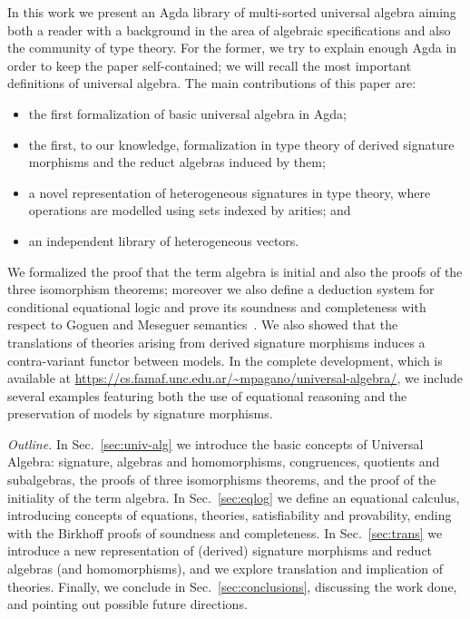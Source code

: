 In this work we present an Agda library of multi-sorted universal
algebra aiming both a reader with a background in the area of
algebraic specifications and also the community of type theory.  For
the former, we try to explain enough Agda in order to keep the paper
self-contained; we will recall the most important definitions of
universal algebra. The main contributions of this paper are:
\begin{itemize}
\item the first formalization of basic universal algebra in Agda;
\item the first, to our knowledge, formalization in type theory of
  derived signature morphisms and the reduct algebras induced by them;
\item a novel representation of heterogeneous signatures in
  type theory, where operations are modelled using sets indexed by
  arities; and
\item an independent library of heterogeneous vectors.
\end{itemize}
We formalized the proof that the term algebra is initial and also the
proofs of the three isomorphism theorems; moreover we also define a
deduction system for conditional equational logic and prove its
soundness and completeness with respect to Goguen and Meseguer semantics~\cite{GoguenM82}.
We also showed that the translations of
theories arising from derived signature morphisms induces a
contra-variant functor between models.  In the complete development,
which is available at
\url{https://cs.famaf.unc.edu.ar/~mpagano/universal-algebra/}, we
include several examples featuring both the use of equational
reasoning and the preservation of models by signature morphisms.

\textit{Outline.} In Sec.~\ref{sec:univ-alg} we introduce the basic
concepts of Universal Algebra: signature, algebras and homomorphisms,
congruences, quotients and subalgebras, the proofs of three
isomorphisms theorems, and the proof of the initiality of the term
algebra.  In Sec.~\ref{sec:eqlog} we define an equational calculus, introducing
concepts of equations, theories, satisfiability and provability,
ending with the Birkhoff proofs of soundness and completeness.  In
Sec.~\ref{sec:trans} we introduce a new representation of (derived) signature
morphisms and reduct algebras (and homomorphisms), and we explore
translation and implication of theories.
Finally, we conclude in Sec.~\ref{sec:conclusions}, discussing the
work done, and pointing out possible future directions.
